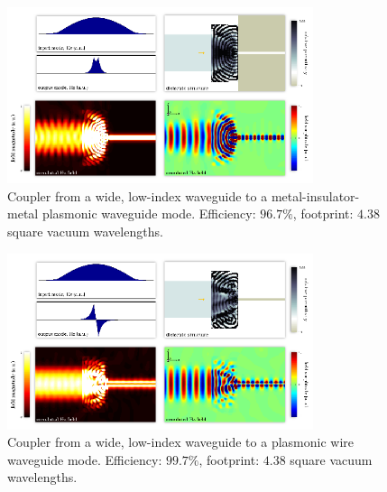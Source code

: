 \documentclass[letterpaper,10pt]{article}
\begin{document}
\begin{appendix}
\begin{figure}[h!]
    \centering
    \includegraphics[width=0.8\textwidth]{14}
    \caption{
        Coupler from a wide, low-index waveguide to a
            metal-insulator-metal plasmonic waveguide mode.
        Efficiency: $96.7\%$,
        footprint: $4.38$ square vacuum wavelengths.
        }
\end{figure}
\begin{figure}[h!]
    \centering
    \includegraphics[width=0.8\textwidth]{15}
    \caption{
        Coupler from a wide, low-index waveguide to a
            plasmonic wire waveguide mode.
        Efficiency: $99.7\%$,
        footprint: $4.38$ square vacuum wavelengths.
        }
\end{figure}
\clearpage


\end{appendix}
\end{document}
